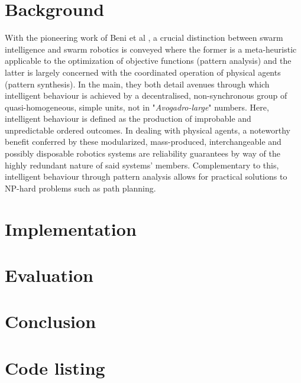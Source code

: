 \documentclass{report}
\begin{document}
\chapter{Background}
With the pioneering work of Beni et al \cite{Beni2005a}, a crucial distinction between swarm intelligence and swarm robotics is conveyed where the former is a meta-heuristic applicable to the optimization of objective functions (pattern analysis) and the latter is largely concerned with the coordinated operation of physical agents (pattern synthesis). In the main, they both detail avenues through which intelligent behaviour is achieved by a decentralised, non-synchronous group of quasi-homogeneous, simple units, not in "\textit{Avogadro-large}" numbers. Here, intelligent behaviour is defined as the production of improbable and unpredictable ordered outcomes. In dealing with physical agents, a noteworthy benefit conferred by these modularized, mass-produced, interchangeable and possibly disposable robotics systems are reliability guarantees by way of the highly redundant nature of said systems' members. Complementary to this, intelligent behaviour through pattern analysis allows for practical solutions to NP-hard problems such as path planning.

\chapter{Implementation}
\chapter{Evaluation}
\chapter{Conclusion}

\appendix


\chapter{Code listing}
\end{document}
